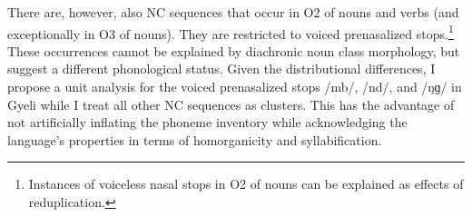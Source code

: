 There are, however, also NC sequences that occur in O2 of nouns and verbs (and exceptionally in O3 of nouns). They are restricted to voiced prenasalized stops.\footnote{Instances of voiceless nasal stops in O2 of nouns can be explained as effects of reduplication.} These occurrences cannot be explained by diachronic noun class morphology, but suggest a different phonological status. Given the distributional differences, I propose a unit analysis for the voiced prenasalized stops /mb/, /nd/, and /ŋɡ/ in Gyeli while I treat all other NC sequences as clusters. This has the advantage of not artificially inflating the phoneme inventory while acknowledging the language's properties in terms of homorganicity and syllabification.









